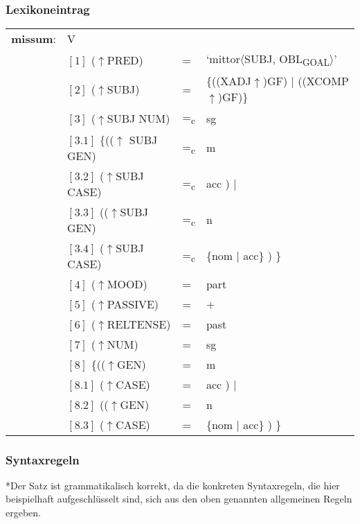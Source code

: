 \documentclass[12pt,a4paper]{article}
\begin{document}
\subsubsection{Lexikoneintrag}
\begin{singlespace}
\begin{tabular}{ l  l  l  l  } 
\textbf{missum}: & V \\
$\qquad$ & $[1]$ \:  ($\uparrow$PRED) & = & `mittor$\langle$SUBJ, OBL\textsubscript{GOAL}$\rangle$'\\
$\qquad$ & $[2]$ \:  ($\uparrow$SUBJ) & = & \{((XADJ$\uparrow$)GF) $\mid$ ((XCOMP$\uparrow$)GF)\} \\
$\qquad$ & $[3]$ \:  ($\uparrow$SUBJ NUM) & =\textsubscript{c} & sg \\
$\qquad$ & $[3.1]$ \:  \{(($\uparrow$ SUBJ GEN) & =\textsubscript{c} & m \\ 
$\qquad$ & $[3.2]$ \:  ($\uparrow$SUBJ CASE) & =\textsubscript{c} & acc ) $\mid$\\
$\qquad$ & $[3.3]$ \: (($\uparrow$SUBJ GEN) & =\textsubscript{c} & n \\
$\qquad$ & $[3.4]$ \:  ($\uparrow$SUBJ CASE) & =\textsubscript{c} & \{nom $\mid$ acc\} ) \}\\
$\qquad$ & $[4]$ \:  ($\uparrow$MOOD) & = & part\\
$\qquad$ & $[5]$ \:  ($\uparrow$PASSIVE) & = & + \\
$\qquad$ & $[6]$ \:  ($\uparrow$RELTENSE) & = & past \\
$\qquad$ & $[7]$ \:  ($\uparrow$NUM) & = & sg \\
$\qquad$ & $[8]$ \:  \{(($\uparrow$GEN) & = & m \\ 
$\qquad$ & $[8.1]$ \:  ($\uparrow$CASE) & = & acc ) $\mid$\\
$\qquad$ & $[8.2]$ \: (($\uparrow$GEN) & = & n \\
$\qquad$ & $[8.3]$ \:  ($\uparrow$CASE) & = & \{nom $\mid$ acc\} ) \}\\
\end{tabular}
\newline
\newline
\end{singlespace}


\subsubsection{Syntaxregeln}
*Der Satz ist grammatikalisch korrekt, da die konkreten Syntaxregeln, die hier beispielhaft aufgeschlüsselt sind, sich aus den oben genannten allgemeinen Regeln ergeben.
\end{document}
